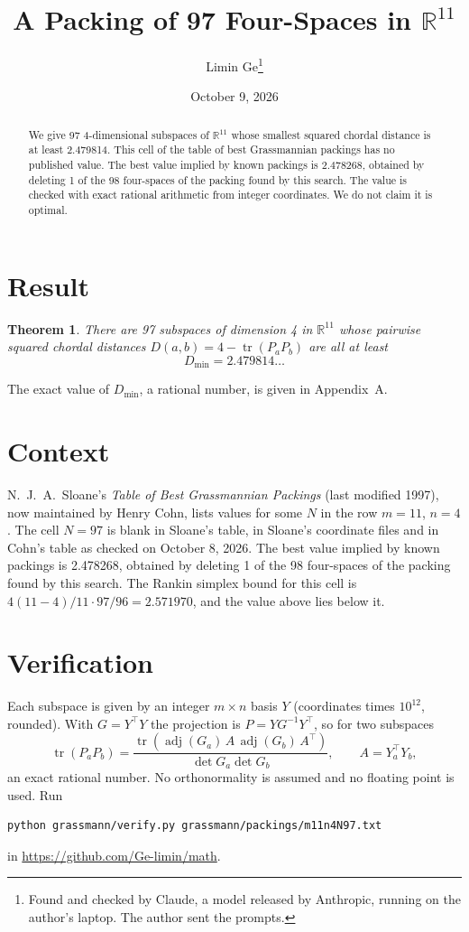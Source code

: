 \documentclass[11pt,a4paper]{article}
\title{A Packing of 97 Four-Spaces in $\mathbb{R}^{11}$}
\author{Limin Ge\thanks{Found and checked by Claude, a model released by Anthropic, running on the author's laptop. The author sent the prompts.}}
\date{October 9, 2026}
\newtheorem*{theorem}{Theorem}
\begin{document}
\maketitle
\begin{abstract}
We give 97 4-dimensional subspaces of $\mathbb{R}^{11}$ whose smallest squared chordal distance is at least 2.479814. This cell of the table of best Grassmannian packings has no published value. The best value implied by known packings is 2.478268, obtained by deleting 1 of the 98 four-spaces of the packing found by this search. The value is checked with exact rational arithmetic from integer coordinates. We do not claim it is optimal.
\end{abstract}

\section{Result}
\begin{theorem}
There are 97 subspaces of dimension 4 in $\mathbb{R}^{11}$ whose pairwise squared chordal distances $D(a,b) = 4 - \operatorname{tr}(P_aP_b)$ are all at least
\[ D_{\min} = 2.479814\ldots \]
\end{theorem}
The exact value of $D_{\min}$, a rational number, is given in Appendix~A.


\section{Context}
N.~J.~A.~Sloane's \emph{Table of Best Grassmannian Packings} (last modified 1997), now maintained by Henry Cohn, lists values for some $N$ in the row $m=11$, $n=4$. The cell $N=97$ is blank in Sloane's table, in Sloane's coordinate files and in Cohn's table as checked on October 8, 2026. The best value implied by known packings is 2.478268, obtained by deleting 1 of the 98 four-spaces of the packing found by this search. The Rankin simplex bound for this cell is $4(11-4)/11\cdot 97/96 = 2.571970$, and the value above lies below it.


\section{Verification}
Each subspace is given by an integer $m\times n$ basis $Y$ (coordinates times $10^{12}$, rounded). With $G=Y^\top Y$ the projection is $P=YG^{-1}Y^\top$, so for two subspaces
\[ \operatorname{tr}(P_aP_b)=\frac{\operatorname{tr}(\operatorname{adj}(G_a)\,A\,\operatorname{adj}(G_b)\,A^\top)}{\det G_a\det G_b},\qquad A=Y_a^\top Y_b, \]
an exact rational number. No orthonormality is assumed and no floating point is used. Run
\begin{verbatim}
python grassmann/verify.py grassmann/packings/m11n4N97.txt
\end{verbatim}
in \url{https://github.com/Ge-limin/math}.
\end{document}
